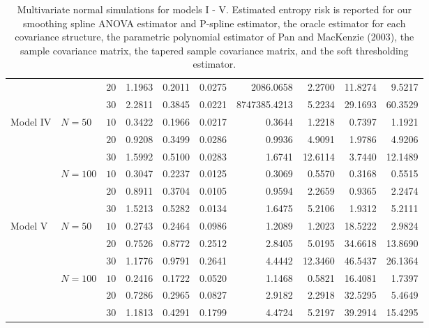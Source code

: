 \begin{table}[ht]
\begin{tabular}{l|lrrrrrrrr}
    &   & $20$ & 1.1963 & 0.2011 & 0.0275 & 2086.0658 & 2.2700 & 11.8274 & 9.5217 \\ 
    &   & $30$ & 2.2811 & 0.3845 & 0.0221 & 8747385.4213 & 5.2234 & 29.1693 & 60.3529 \\ 
        \hdashline
       \hdashline
  Model IV & $N = 50$ & $10$ & 0.3422 & 0.1966 & 0.0217 & 0.3644 & 1.2218 & 0.7397 & 1.1921 \\ 
    &   & $20$ & 0.9208 & 0.3499 & 0.0286 & 0.9936 & 4.9091 & 1.9786 & 4.9206 \\ 
    &   & $30$ & 1.5992 & 0.5100 & 0.0283 & 1.6741 & 12.6114 & 3.7440 & 12.1489 \\
            \hdashline 
    & $N = 100$ & $10$ & 0.3047 & 0.2237 & 0.0125 & 0.3069 & 0.5570 & 0.3168 & 0.5515 \\ 
    &   & $20$ & 0.8911 & 0.3704 & 0.0105 & 0.9594 & 2.2659 & 0.9365 & 2.2474 \\ 
    &   & $30$ & 1.5213 & 0.5282 & 0.0134 & 1.6475 & 5.2106 & 1.9312 & 5.2111 \\ 
        \hdashline
       \hdashline
  Model V & $N = 50$ & $10$ & 0.2743 & 0.2464 & 0.0986 & 1.2089 & 1.2023 & 18.5222 & 2.9824 \\ 
    &   & $20$ & 0.7526 & 0.8772 & 0.2512 & 2.8405 & 5.0195 & 34.6618 & 13.8690 \\ 
    &   & $30$ & 1.1776 & 0.9791 & 0.2641 & 4.4442 & 12.3460 & 46.5437 & 26.1364 \\ 
            \hdashline
    & $N = 100$ & $10$ & 0.2416 & 0.1722 & 0.0520 & 1.1468 & 0.5821 & 16.4081 & 1.7397 \\ 
    &   & $20$ & 0.7286 & 0.2965 & 0.0827 & 2.9182 & 2.2918 & 32.5295 & 5.4649 \\ 
    &   & $30$ & 1.1813 & 0.4291 & 0.1799 & 4.4724 & 5.2197 & 39.2914 & 15.4295 \\ 
\end{tabular}
\caption{Multivariate normal simulations for models I - V. Estimated entropy risk is 
            reported for our smoothing spline ANOVA estimator and P-spline estimator, the oracle estimator for 
            each covariance structure, the parametric polynomial estimator of Pan and MacKenzie (2003),
            the sample covariance matrix, the tapered sample covariance matrix, and the soft thresholding estimator.} 
\end{table}

